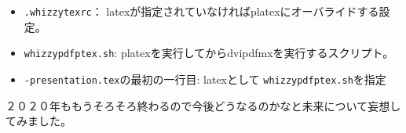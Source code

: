 \documentclass[mingoth,a4paper]{jsarticle}
\begin{document}
\begin{itemize}
 \item \texttt{.whizzytexrc}： latexが指定されていなければplatexにオーバライドする設定。
 \item \texttt{whizzypdfptex.sh}: platexを実行してからdvipdfmxを実行するスクリプト。
 \item \texttt{-presentation.tex}の最初の一行目: latexとして
       \texttt{whizzypdfptex.sh}を指定
\end{itemize}


２０２０年ももうそろそろ終わるので今後どうなるのかなと未来について妄想してみました。
\end{document}

